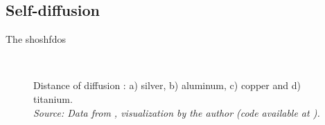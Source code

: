 \subsection{Self-diffusion}

The shoshfdos

\begin{figure}[H]
 \centering
 \captionsetup{justification=centering}
   \\
 \caption{Distance of diffusion : a) silver, b) aluminum, c) copper and d) titanium.\\ 
 \textit{Source: Data from \citep{kakusan}, visualization by the author (code available at \citep{mygit}).}}
 \label{fig:selfdiff_dist}
\end{figure}


